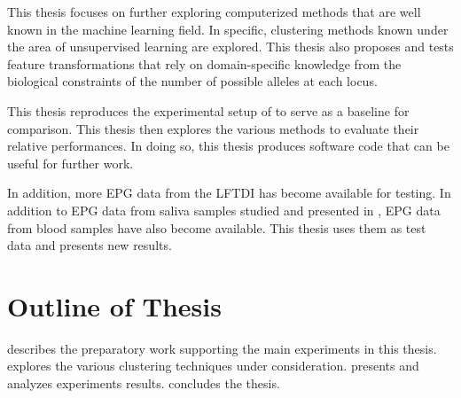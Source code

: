 This thesis focuses on further exploring computerized methods that are well known in the machine learning field. In specific, clustering methods known under the area of unsupervised learning are explored. This thesis also proposes and tests feature transformations that rely on domain-specific knowledge from the biological constraints of the number of possible alleles at each locus.

This thesis reproduces the experimental setup of \cite{odonnell_clustering_2021} to serve as a baseline for comparison. This thesis then explores the various methods to evaluate their relative performances. In doing so, this thesis produces software code that can be useful for further work.

In addition, more EPG data from the LFTDI has become available for testing. In addition to EPG data from saliva samples studied and presented in \cite{odonnell_clustering_2021}, EPG data from blood samples have also become available. This thesis uses them as test data and presents new results.

\section{Outline of Thesis}

 describes the preparatory work supporting the main experiments in this thesis.  explores the various clustering techniques under consideration.  presents and analyzes experiments results.  concludes the thesis.
